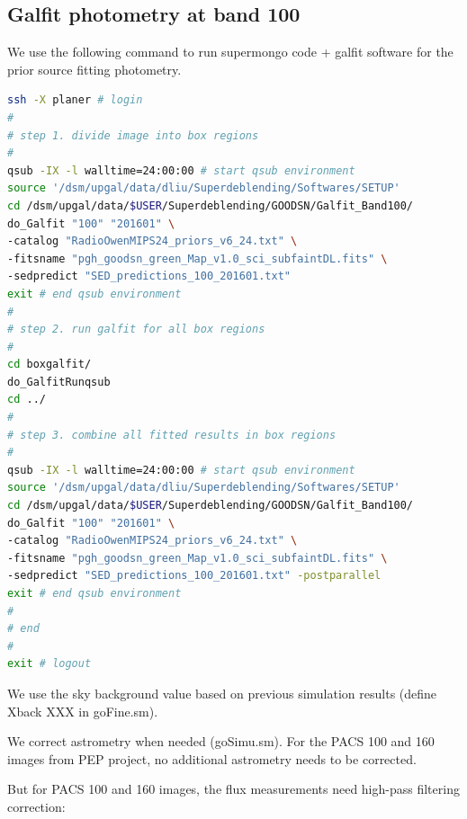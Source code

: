 \documentclass[11pt,a4paper]{article}
\begin{document}
\subsection{Galfit photometry at band 100}
\label{Band100_Galfit}

We use the following command to run supermongo code + galfit software for the prior source fitting photometry. 

\begin{lstlisting}[language=bash]
ssh -X planer # login
# 
# step 1. divide image into box regions
# 
qsub -IX -l walltime=24:00:00 # start qsub environment
source '/dsm/upgal/data/dliu/Superdeblending/Softwares/SETUP'
cd /dsm/upgal/data/$USER/Superdeblending/GOODSN/Galfit_Band100/
do_Galfit "100" "201601" \
-catalog "RadioOwenMIPS24_priors_v6_24.txt" \
-fitsname "pgh_goodsn_green_Map_v1.0_sci_subfaintDL.fits" \
-sedpredict "SED_predictions_100_201601.txt"
exit # end qsub environment
# 
# step 2. run galfit for all box regions
# 
cd boxgalfit/
do_GalfitRunqsub
cd ../
# 
# step 3. combine all fitted results in box regions
# 
qsub -IX -l walltime=24:00:00 # start qsub environment
source '/dsm/upgal/data/dliu/Superdeblending/Softwares/SETUP'
cd /dsm/upgal/data/$USER/Superdeblending/GOODSN/Galfit_Band100/
do_Galfit "100" "201601" \
-catalog "RadioOwenMIPS24_priors_v6_24.txt" \
-fitsname "pgh_goodsn_green_Map_v1.0_sci_subfaintDL.fits" \
-sedpredict "SED_predictions_100_201601.txt" -postparallel
exit # end qsub environment
# 
# end
# 
exit # logout
\end{lstlisting}

We use the sky background value based on previous simulation results (define Xback XXX in goFine.sm). 

We correct astrometry when needed (goSimu.sm). For the PACS 100 and 160 images from PEP project, no additional astrometry needs to be corrected. 

But for PACS 100 and 160 images, the flux measurements need high-pass filtering correction: 
\end{document}
